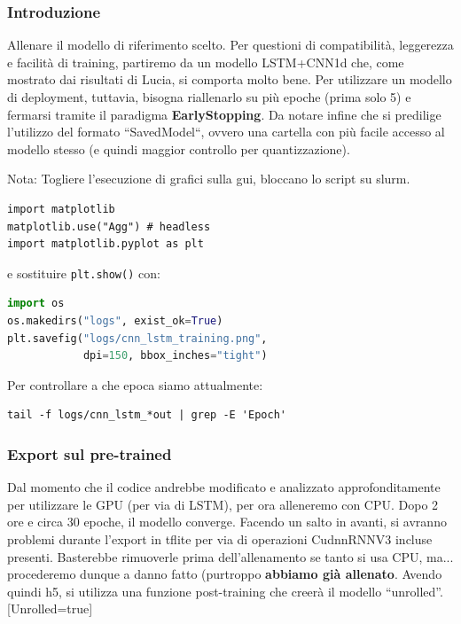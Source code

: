\subsubsection{Introduzione}
Allenare il modello di riferimento scelto. Per questioni di compatibilità, leggerezza e facilità di training, partiremo da un modello LSTM+CNN1d che, come mostrato dai risultati di Lucia, si comporta molto bene. Per utilizzare un modello di deployment, tuttavia, bisogna riallenarlo su più epoche (prima solo 5) e fermarsi tramite il paradigma \textbf{EarlyStopping}. Da notare infine che si predilige l'utilizzo del formato ``SavedModel``, ovvero una cartella con più facile accesso al modello stesso (e quindi maggior controllo per quantizzazione).

\begin{center}
    Nota: Togliere l'esecuzione di grafici sulla gui, bloccano lo script su slurm. 
\end{center}

\begin{verbatim}
import matplotlib
matplotlib.use("Agg") # headless
import matplotlib.pyplot as plt
\end{verbatim}
e sostituire \texttt{plt.show()} con:

\begin{lstlisting}[language=Python]
import os
os.makedirs("logs", exist_ok=True)
plt.savefig("logs/cnn_lstm_training.png",
            dpi=150, bbox_inches="tight")
\end{lstlisting}
Per controllare a che epoca siamo attualmente: 
\begin{verbatim}
tail -f logs/cnn_lstm_*out | grep -E 'Epoch'
\end{verbatim}

\subsubsection{Export sul pre-trained}
Dal momento che il codice andrebbe modificato e analizzato approfonditamente per utilizzare le GPU (per via di LSTM), per ora alleneremo con CPU. Dopo 2 ore e circa 30 epoche, il modello converge.
Facendo un salto in avanti, si avranno problemi durante l'export in tflite per via di operazioni CudnnRNNV3 incluse presenti. Basterebbe rimuoverle prima dell'allenamento se tanto si usa CPU, ma... procederemo dunque a danno fatto (purtroppo \textbf{abbiamo già allenato}. Avendo quindi h5, si utilizza una funzione post-training che creerà il modello ``unrolled''. [Unrolled=true]

